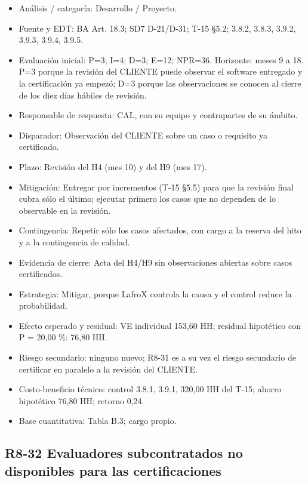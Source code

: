 \begin{itemize}[leftmargin=*,itemsep=3pt]
\item Análisis / categoría: Desarrollo / Proyecto.
\item Fuente y EDT: BA Art. 18.3; SD7 D-21/D-31; T-15 §5.2; 3.8.2, 3.8.3, 3.9.2, 3.9.3, 3.9.4, 3.9.5.
\item Evaluación inicial: P=3; I=4; D=3; E=12; NPR=36. Horizonte: meses 9 a 18. P=3 porque la revisión del CLIENTE puede observar el software entregado y la certificación ya empezó; D=3 porque las observaciones se conocen al cierre de los diez días hábiles de revisión.
\item Responsable de respuesta: CAL, con su equipo y contrapartes de su ámbito.
\item Disparador: Observación del CLIENTE sobre un caso o requisito ya certificado.
\item Plazo: Revisión del H4 (mes 10) y del H9 (mes 17).
\item Mitigación: Entregar por incrementos (T-15 §5.5) para que la revisión final cubra sólo el último; ejecutar primero los casos que no dependen de lo observable en la revisión.
\item Contingencia: Repetir sólo los casos afectados, con cargo a la reserva del hito y a la contingencia de calidad.
\item Evidencia de cierre: Acta del H4/H9 sin observaciones abiertas sobre casos certificados.
\item Estrategia: Mitigar, porque LafroX controla la causa y el control reduce la probabilidad.
\item Efecto esperado y residual: VE individual 153,60 HH; residual hipotético con P = 20,00 \%: 76,80 HH.
\item Riesgo secundario: ninguno nuevo; R8-31 es a su vez el riesgo secundario de certificar en paralelo a la revisión del CLIENTE.
\item Costo-beneficio técnico: control 3.8.1, 3.9.1, 320,00 HH del T-15; ahorro hipotético 76,80 HH; retorno 0,24.
\item Base cuantitativa: Tabla B.3; cargo propio.
\end{itemize}

\subsection*{R8-32 \textemdash{} Evaluadores subcontratados no disponibles para las certificaciones}

